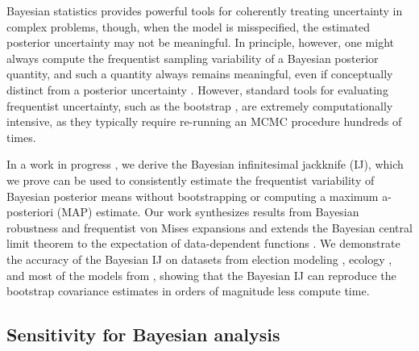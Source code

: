 Bayesian statistics provides powerful tools for coherently treating uncertainty
in complex problems, though, when the model is misspecified, the estimated
posterior uncertainty may not be meaningful.  In principle, however, one might
always compute the frequentist sampling variability of a Bayesian posterior
quantity, and such a quantity always remains meaningful, even if conceptually
distinct from a posterior uncertainty \citep{waddell:2002:bayesphyloboot,
kleijn:2006:misspecification}.  However, standard tools for evaluating
frequentist uncertainty, such as the bootstrap \citep{huggins:2019:bayesbag},
are extremely computationally intensive, as they typically require re-running an
MCMC procedure hundreds of times.

In a work in progress \citep{giordano:2020:bayesij}, we derive the Bayesian
infinitesimal jackknife (IJ), which we prove can be used to consistently
estimate the frequentist variability of Bayesian posterior means without
bootstrapping or computing a maximum a-posteriori (MAP) estimate.  Our work
synthesizes results from Bayesian robustness and frequentist von Mises
expansions and extends the Bayesian central limit theorem to the expectation of
data-dependent functions
\citep{jaeckel:1972:infinitesimal,shao:2012:jackknife,giordano:2019:ij,gustafson:2012:localrobustnessbook,giordano:2018:covariances,
lehman:1983:pointestimation, kass:1990:posteriorexpansions}. We demonstrate the
accuracy of the Bayesian IJ on datasets from election modeling
\citep{economist:2020:election}, ecology \citep{kery:2011:bayesian}, and most of
the models from \citep{gelman:2006:arm, stan-examples:2017}, showing that the
Bayesian IJ can reproduce the bootstrap covariance estimates in orders of
magnitude less compute time.






\subsection*{Sensitivity for Bayesian analysis}

